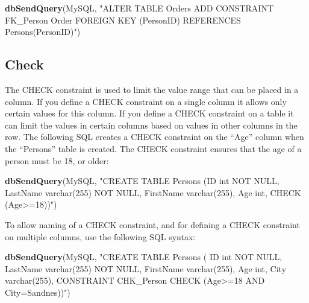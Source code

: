 \documentclass[
]{book}
\newenvironment{Shaded}{\begin{snugshade}}{\end{snugshade}}
\newcommand{\FunctionTok}[1]{\textcolor[rgb]{0.13,0.29,0.53}{\textbf{#1}}}
\newcommand{\NormalTok}[1]{#1}
\newcommand{\StringTok}[1]{\textcolor[rgb]{0.31,0.60,0.02}{#1}}
\begin{document}
\begin{Shaded}
\begin{Highlighting}[]
\FunctionTok{dbSendQuery}\NormalTok{(MySQL,}
\StringTok{"ALTER TABLE Orders}
\StringTok{ADD CONSTRAINT FK\_Person Order}
\StringTok{FOREIGN KEY (PersonID) REFERENCES Persons(PersonID)"}\NormalTok{)}
\end{Highlighting}
\end{Shaded}

\hypertarget{check}{%
\subsection{Check}\label{check}}

The CHECK constraint is used to limit the value range that can be placed in a column. If you define a CHECK constraint on a single column it allows only certain values for this column. If you define a CHECK constraint on a table it can limit the values in certain columns based on values in other columns in the row. The following SQL creates a CHECK constraint on the ``Age'' column when the ``Persons'' table is created. The CHECK constraint ensures that the age of a person must be 18, or older:

\begin{Shaded}
\begin{Highlighting}[]
\FunctionTok{dbSendQuery}\NormalTok{(MySQL,}
\StringTok{"CREATE TABLE Persons (ID int NOT NULL,}
\StringTok{                      LastName varchar(255) NOT NULL,}
\StringTok{                      FirstName varchar(255),}
\StringTok{                      Age int,}
\StringTok{                      CHECK (Age\textgreater{}=18))"}\NormalTok{)}
\end{Highlighting}
\end{Shaded}

To allow naming of a CHECK constraint, and for defining a CHECK constraint on multiple columns, use the following SQL syntax:

\begin{Shaded}
\begin{Highlighting}[]
\FunctionTok{dbSendQuery}\NormalTok{(MySQL,}
\StringTok{"CREATE TABLE Persons (}
\StringTok{    ID int NOT NULL,}
\StringTok{    LastName varchar(255) NOT NULL,}
\StringTok{    FirstName varchar(255),}
\StringTok{    Age int,}
\StringTok{    City varchar(255),}
\StringTok{    CONSTRAINT CHK\_Person CHECK (Age\textgreater{}=18 AND City=\textquotesingle{}Sandnes\textquotesingle{}))"}\NormalTok{)}
\end{Highlighting}
\end{Shaded}
\end{document}
